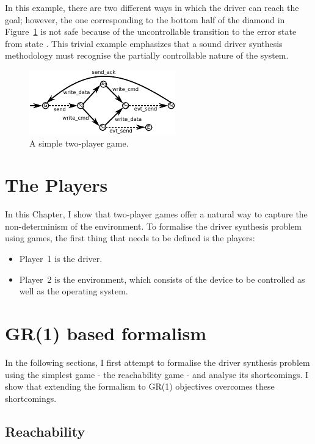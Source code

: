 In this example, there are two different ways in which the driver can reach the goal; however, the one corresponding to the bottom half of the diamond in Figure~\ref{f:game} is not safe because of the uncontrollable transition to the error state from state . This trivial example emphasizes that a sound driver synthesis methodology must recognise the partially controllable nature of the system. 

\begin{figure}[t]
    \center
    \includegraphics[width=0.7\linewidth]{imgs/game.pdf}
    \caption{A simple two-player game.}
    \label{f:game}
\end{figure}

\section{The Players}
In this Chapter, I show that two-player games offer a natural way to capture the non-determinism of the environment. To formalise the driver synthesis problem using games, the first thing that needs to be defined is the players:

\begin{itemize}
    \item Player~1 is the driver. 
    \item Player~2 is the environment, which consists of the device to be controlled as well as the operating system.
\end{itemize}

\section{GR(1) based formalism}

In the following sections, I first attempt to formalise the driver synthesis problem using the simplest game - the reachability game - and analyse its shortcomings. I show that extending the formalism to GR(1) objectives overcomes these shortcomings.

\subsection{Reachability}

